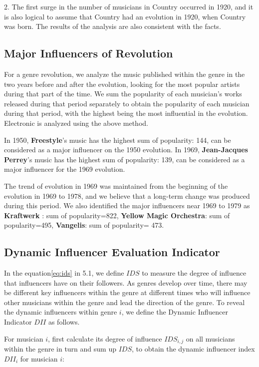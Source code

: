 \documentclass[12pt]{article}  %
\begin{document}
2. The first surge in the number of musicians in Country occurred in 1920, and it is also logical to assume that Country had an evolution in 1920, when Country was born. The results of the analysis are also consistent with the facts\cite{7}.

\vspace{-0.5cm}
\subsection{Major Influencers of Revolution}
For a genre revolution, we analyze the music published within the genre in the two years before and after the evolution, looking for the most popular artists during that part of the time. We sum the popularity of each musician's works released during that period separately to obtain the popularity of each musician during that period, with the highest being the most influential in the evolution. Electronic is analyzed using the above method.

In 1950, \textbf{Freestyle}'s music has the highest sum of popularity: 144, can be considered as a major influencer on the 1950 evolution. In 1969, \textbf{Jean-Jacques Perrey}'s music has the highest sum of popularity: 139, can be considered as a major influencer for the 1969 evolution.

The trend of evolution in 1969 was maintained from the beginning of the evolution in 1969 to 1978, and we believe that a long-term change was produced during this period. We also identified the major influencers near 1969 to 1979 as \textbf{Kraftwerk} : sum of popularity=822, \textbf{Yellow Magic Orchestra}: sum of popularity=495, \textbf{Vangelis}: sum of popularity= 473.

\vspace{-0.5cm}
\subsection{Dynamic Influencer Evaluation Indicator}
In the equation\eqref{eq:ids} in 5.1, we define $IDS$ to measure the degree of influence that influencers have on their followers. As genres develop over time, there may be different key influencers within the genre at different times who will influence other musicians within the genre and lead the direction of the genre. To reveal the dynamic influencers within genre $i$, we define the Dynamic Influencer Indicator $DII$ as follows.

For musician $i$, first calculate its degree of influence $IDS_{i,j}$ on all musicians within the genre in turn and sum up $IDS$, to obtain the dynamic influencer index $DII_i$ for musician $i$:
\end{document}
